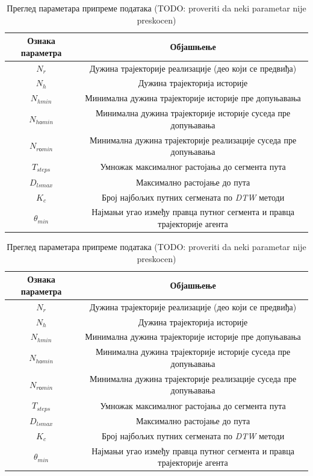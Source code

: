 \documentclass[11pt,oneside]{memoir}
\begin{document}
\begin{table}[H]
  \begin{tabular}{c|c}
    Ознака параметра & Објашњење \\
    \hline
    $N_r$ & Дужина трајекторије реализације (део који се предвиђа) \\
    $N_h$ & Дужина трајекторија историје \\
    $N_{hmin}$ & Минимална дужина трајекторије историје пре допуњавања \\
    $N_{hоmin}$ & Минимална дужина трајекторије историје суседа пре допуњавања \\
    $N_{rоmin}$ & Минимална дужина трајекторије реализације суседа пре допуњавања \\
    $T_{steps}$ & Умножак максималног растојања до сегмента пута \\
    $D_{lsmax}$ & Максимално растојање до пута \\
    $K_c$ & Број најбољих путних сегмената по \textit{DTW} методи \\
    $\theta_{min}$ & Најмањи угао између правца путног сегмента и правца трајекторије агента
  \end{tabular}
  \caption{Преглед параметара припреме података (TODO: proveriti da neki parametar nije preskocen)}
  \label{dp-params-table}
\end{table}
\begin{table}[H]
  \begin{tabular}{c|c}
    Ознака параметра & Објашњење \\
    \hline
    $N_r$ & Дужина трајекторије реализације (део који се предвиђа) \\
    $N_h$ & Дужина трајекторија историје \\
    $N_{hmin}$ & Минимална дужина трајекторије историје пре допуњавања \\
    $N_{hоmin}$ & Минимална дужина трајекторије историје суседа пре допуњавања \\
    $N_{rоmin}$ & Минимална дужина трајекторије реализације суседа пре допуњавања \\
    $T_{steps}$ & Умножак максималног растојања до сегмента пута \\
    $D_{lsmax}$ & Максимално растојање до пута \\
    $K_c$ & Број најбољих путних сегмената по \textit{DTW} методи \\
    $\theta_{min}$ & Најмањи угао између правца путног сегмента и правца трајекторије агента
  \end{tabular}
  \caption{Преглед параметара припреме података (TODO: proveriti da neki parametar nije preskocen)}
  \label{dp-params-table}
\end{table}
\end{document}
